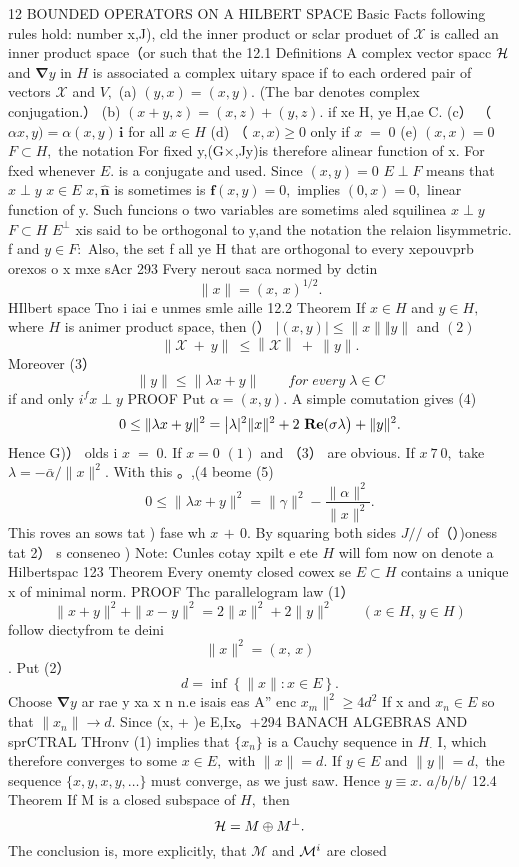 12 BOUNDED OPERATORS ON A HILBERT SPACE Basic Facts following rules hold: number x,J), cld the inner product or sclar produet of $\textstyle{\mathcal{X}}$ is called an inner product space（or such that the 12.1 Definitions A complex vector spacc ${\cal{H}}$ and $\mathbf{\nabla}y$ in $H$ is associated a complex uitary space if to each ordered pair of vectors $\scriptstyle{\mathcal{X}}$ and ${\mathit{V}},$ (a) $(y,x)=(x,y).$ (The bar denotes complex conjugation.） (b) $(x+y,z)=(x,z)+(y,z).$ if xe H, ye H,ae C. (c） （ $\alpha x,y)=\alpha(x,y)\,\mathbf{i}$ for all $x\in H$ (d) （ $x,x)\geq0$ only if $\scriptstyle x\;=\;0$ (e) $(x,x)=0$ $F\subset H,$ the notation For fixed y,(G×,Jy)is therefore alinear function of x. For fxed whenever $E.$ is a conjugate and used. Since $(x,y)=0$ $E\perp F$ means that $x\perp y$ $x\in E$ $x,{\hat{\mathbf{n}}}$ is sometimes is $\mathbf{f}\left(x,y\right)=0,$ implies $(0,x)=0,$ linear function of y. Such funcions o two variables are sometims aled squilinea $x\perp y$ $F\subset H$ $E^{\perp}$ xis said to be orthogonal to y,and the notation the relaion lisymmetric. f and $y\in F\colon$ Also, the set f all ye H that are orthogonal to every xepouvprb orexos o x mxe sAcr 293 Fvery nerout saca normed by dctin $$ \|x\|=(x,\,x)^{1/2}. $$ HIlbert space Tno i iai e unmes smle aille 12.2 Theorem If $x\in H$ and $y\in H,$ where $\textstyle H$ is animer product space, then (） $|(x,y)|\leq\|x\|\Vert y\|$ and $(2)$ $$ \left\|{\mathcal{X}}\ +\ y\right\|\ \leq\left\|{\mathcal{X}}\right\|\ +\ \|y\|. $$ Moreover (3） $$ \|y\|\le\|\lambda x+y\|\qquad f o r\;e v e r y\;\lambda\in C $$ if and only $i^{f}x\perp y$ PROOF Put $\alpha=(x,y).$ A simple comutation gives (4) $$ 0\leq\|\lambda x+y\|^{2}=\left|\lambda|^{2}\|x\|^{2}+2\mathrm{\bf~Re} (\sigma\lambda\right)+\|y\|^{2}. $$ Hence G)） olds i $\scriptstyle x\;=\;0.$ If $x=0$ $\operatorname{\mathcal{(1)}}$ and （3） are obvious. If $x\ 7\ 0,$ take $\lambda=-\bar{\alpha}/\|x\|^{2}.$ With this 。,(4 beome (5) $$ 0\leq\|\lambda x+y\|^{2}=\|\gamma\|^{2}-{\frac{\|\alpha\|^{2}}{\|x\|^{2}}}. $$ This roves an sows tat ) fase wh $\scriptstyle x\,+\,0.$ By squaring both sides $J/\slash$ of（）)oness tat 2） s conseneo ) Note: Cunles cotay xpilt e ete $\textstyle{H}$ will fom now on denote a Hilbertspac 123 Theorem Every onemty closed cowex se $E\subset H$ contains a unique x of minimal norm. PROOF Thc parallelogram law (1） $$ \|x+y\|^{2}+\|x-y\|^{2}=2\|x\|^{2}+2\|y\|^{2}\qquad(x\in H,\,y\in H) $$ follow diectyfrom te deini $$ \|x\|^{2}=(x,\,x) $$ . Put (2） $$ d=\operatorname*{inf}\left\{\|x\|\colon x\in E\right\}. $$ Choose $\mathbf{\nabla}y$ ar rae y xa x n n.e isais eas A” enc $x_{m}\|^{2}\geq4d^{2}$ If x and $x_{n}\in E$ so that $\|x_{n}\|\to d.$ Since (x, + )e E,Ix。+294 BANACH ALGEBRAS AND sprCTRAL THronv (1) implies that $\scriptstyle\{x_{n}\}$ is a Cauchy sequence in $\textstyle H_{\cdot}$ I, which therefore converges to some $x\in E,$ with $\|x\|=d.$ If $y\in E$ and $\|y\|=d,$ the sequence $\{x,y,x,y,\ldots\}$ must converge, as we just saw. Hence $y\equiv x.$ ${a\!\!\!/}{b\!\!\!/}{b\!\!\!/}$ 12.4 Theorem If M is a closed subspace of $\textstyle H,$ then $$ {\cal H}=M\oplus M^{\perp}. $$ The conclusion is, more explicitly, that $\mathcal{M}$ and ${\cal{M}}^{i}$ are closed 